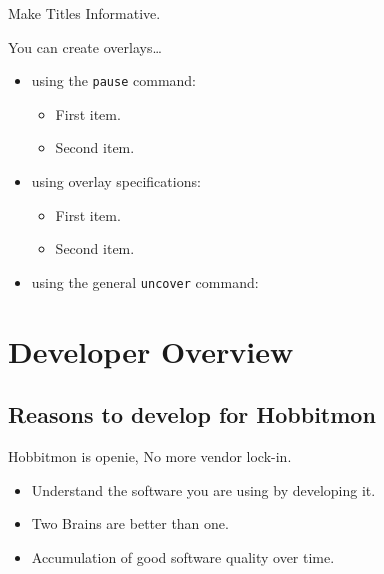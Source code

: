 \documentclass{beamer}
\begin{document}
\begin{frame}{Make Titles Informative.}

  You can create overlays\dots
  \begin{itemize}
  \item using the \texttt{pause} command:
    \begin{itemize}
    \item
      First item.
      \pause
    \item    
      Second item.
    \end{itemize}
  \item
    using overlay specifications:
    \begin{itemize}
    \item<3->
      First item.
    \item<4->
      Second item.
    \end{itemize}
  \item
    using the general \texttt{uncover} command:
    \begin{itemize}
    \end{itemize}
  \end{itemize}
\end{frame}



\section{Developer Overview}

\subsection[Why developing Hobbitmon ]{Reasons to develop for Hobbitmon}

\begin{frame}
{Hobbitmon is open}{ie, No more vendor lock-in.}

  \begin{itemize}
 \item
    Understand the software you are using by developing it.
   \item
    Two Brains are better than one. 
  \item
    Accumulation of good software quality over time.
  \end{itemize}
\end{frame}
\end{document}
